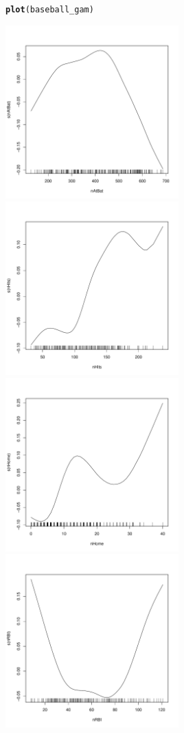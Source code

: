 \documentclass{article}\usepackage[]{graphicx}\usepackage[]{color}
\makeatletter
\newcommand{\hlstd}[1]{\textcolor[rgb]{0.345,0.345,0.345}{#1}}%
\newcommand{\hlkwd}[1]{\textcolor[rgb]{0.737,0.353,0.396}{\textbf{#1}}}%
\newenvironment{kframe}{%
 \def\at@end@of@kframe{}%
 \ifinner\ifhmode%
  \def\at@end@of@kframe{\end{minipage}}%
  \begin{minipage}{\columnwidth}%
 \fi\fi%
 \def\FrameCommand##1{\hskip\@totalleftmargin \hskip-\fboxsep
 \colorbox{shadecolor}{##1}\hskip-\fboxsep
     \hskip-\linewidth \hskip-\@totalleftmargin \hskip\columnwidth}%
 \MakeFramed {\advance\hsize-\width
   \@totalleftmargin\z@ \linewidth\hsize
   \@setminipage}}%
 {\par\unskip\endMakeFramed%
 \at@end@of@kframe}
\newenvironment{knitrout}{}{} %
\makeatother
\begin{document}
\begin{knitrout}
\color{fgcolor}\begin{kframe}
\begin{alltt}
\hlkwd{plot}\hlstd{(baseball_gam)}
\end{alltt}
\end{kframe}
\includegraphics[width=0.50\textwidth]{figure/unnamed-chunk-3-1} 
\includegraphics[width=0.50\textwidth]{figure/unnamed-chunk-3-2} 
\includegraphics[width=0.50\textwidth]{figure/unnamed-chunk-3-3} 
\includegraphics[width=0.50\textwidth]{figure/unnamed-chunk-3-4} 

\end{knitrout}
\end{document}
